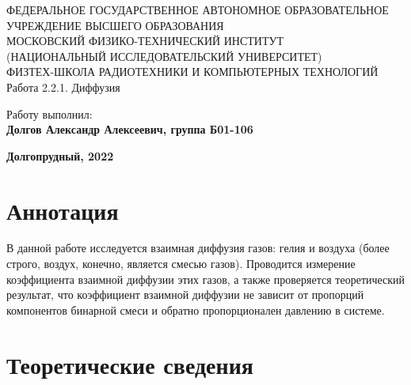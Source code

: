 \documentclass[15pt,a5paper,reqno]{article}
\begin{document}
\begin{center}
  {\small ФЕДЕРАЛЬНОЕ ГОСУДАРСТВЕННОЕ АВТОНОМНОЕ ОБРАЗОВАТЕЛЬНОЕ\\ УЧРЕЖДЕНИЕ ВЫСШЕГО ОБРАЗОВАНИЯ\\ МОСКОВСКИЙ ФИЗИКО-ТЕХНИЧЕСКИЙ ИНСТИТУТ\\ (НАЦИОНАЛЬНЫЙ ИССЛЕДОВАТЕЛЬСКИЙ УНИВЕРСИТЕТ)\\ ФИЗТЕХ-ШКОЛА РАДИОТЕХНИКИ И КОМПЬЮТЕРНЫХ ТЕХНОЛОГИЙ}\\
  \hfill \break
  \hfill \break
  \hfill \break
  \Huge{Работа 2.2.1. Диффузия}\\
\end{center}

\hfill \break
\hfill \break
\hfill \break
\hfill \break
\hfill \break
\hfill \break

\begin{flushright}
  \normalsize{Работу выполнил:}\\
  \normalsize{\textbf{Долгов Александр Алексеевич, группа Б01-106}}\\
\end{flushright}

\hfill \break
\hfill \break
\hfill \break
\hfill \break
\hfill \break

\begin{center}
  \normalsize{\textbf{Долгопрудный, 2022}}
\end{center}


\thispagestyle{empty} %


\newpage
\thispagestyle{plain}
\tableofcontents
\thispagestyle{plain}
\newpage

\section{Аннотация}

	
	В данной работе исследуется взаимная диффузия газов: гелия и воздуха (более строго, воздух, конечно, является смесью газов). Проводится измерение коэффициента взаимной диффузии этих газов, а также проверяется теоретический результат, что коэффициент взаимной диффузии не зависит от пропорций компонентов бинарной смеси и обратно пропорционален давлению в системе.

\section{Теоретические сведения}
\end{document}
